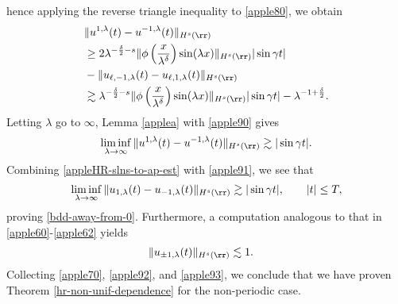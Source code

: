 hence applying the reverse triangle inequality to \eqref{apple80}, we obtain
\begin{equation} 
	\label{apple90}
	\begin{split}
	& \|
	u^{1,\lambda}(t)
	-
	u^{- 1,\lambda}(t)
	\|_{H^s(\rr)}
	\\
	& \ge 2 \lambda^{-\frac{\delta}{2}-s} \|\phi\left(
	\frac{x}{\lambda^\delta} \right) \sin(\lambda x) \|_{H^s(\rr)} |\sin \gamma t|
	\\
	& - \|u_{\ell,-1,\lambda}(t) - u_{\ell,1,\lambda}(t)\|_{H^s(\rr)} 
	\\
	& \gtrsim \lambda^{-\frac{\delta}{2}-s} \|\phi\left(
	\frac{x}{\lambda^\delta} \right ) \sin(\lambda x) \|_{H^s(\rr)} |\sin \gamma t| -
	\lambda^{-1 + \frac{\delta}{2}}.
\end{split}
\end{equation}
%
%
Letting $\lambda$ go to $\infty$, Lemma \ref{applea}
with \eqref{apple90}  gives
%
%
\begin{equation} 
	\label{apple91}
	\liminf_{\lambda \to\infty}
	\|
	u^{1,\lambda}(t)
	-
	u^{- 1,\lambda}(t)
	\|_{H^s(\rr)}
	\gtrsim
	|\sin \gamma t|.
\end{equation}
Combining \eqref{appleHR-slns-to-ap-est} with \eqref{apple91}, we see that
\begin{equation}
	\begin{split}
		\liminf_{\lambda \to \infty} \|u_{1,\lambda}(t) -
		u_{-1,\lambda}(t) \|_{H^s(\rr)} \gtrsim |\sin
		\gamma t |, \qquad |t| \le T,
		\label{apple92}
	\end{split}
\end{equation}
proving \eqref{bdd-away-from-0}. Furthermore, a computation analogous
to that in \eqref{apple60}-\eqref{apple62} yields
\begin{equation}
	\label{apple93}
	\begin{split}
		\|u_{\pm 1, \lambda} (t) \|_{H^{s}(\rr)}
		& \lesssim 1.
	\end{split}
\end{equation}
Collecting \eqref{apple70}, \eqref{apple92}, and \eqref{apple93}, we
conclude that we have proven Theorem \ref{hr-non-unif-dependence} for the
non-periodic case.
